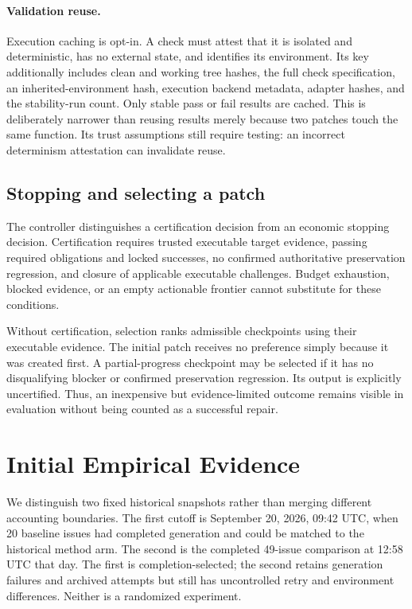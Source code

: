 \documentclass[acmsmall,screen,review,anonymous]{acmart}
\begin{document}
\paragraph{Validation reuse.}
Execution caching is opt-in. A check must attest that it is isolated and deterministic, has no external state, and identifies its environment. Its key additionally includes clean and working tree hashes, the full check specification, an inherited-environment hash, execution backend metadata, adapter hashes, and the stability-run count. Only stable pass or fail results are cached. This is deliberately narrower than reusing results merely because two patches touch the same function. Its trust assumptions still require testing: an incorrect determinism attestation can invalidate reuse.

\subsection{Stopping and selecting a patch}
The controller distinguishes a certification decision from an economic stopping decision. Certification requires trusted executable target evidence, passing required obligations and locked successes, no confirmed authoritative preservation regression, and closure of applicable executable challenges. Budget exhaustion, blocked evidence, or an empty actionable frontier cannot substitute for these conditions.

Without certification, selection ranks admissible checkpoints using their executable evidence. The initial patch receives no preference simply because it was created first. A partial-progress checkpoint may be selected if it has no disqualifying blocker or confirmed preservation regression. Its output is explicitly uncertified. Thus, an inexpensive but evidence-limited outcome remains visible in evaluation without being counted as a successful repair.

\section{Initial Empirical Evidence}
\label{sec:pilot}
We distinguish two fixed historical snapshots rather than merging different accounting boundaries. The first cutoff is September 20, 2026, 09:42 UTC, when 20 baseline issues had completed generation and could be matched to the historical method arm. The second is the completed 49-issue comparison at 12:58 UTC that day. The first is completion-selected; the second retains generation failures and archived attempts but still has uncontrolled retry and environment differences. Neither is a randomized experiment.
\end{document}
